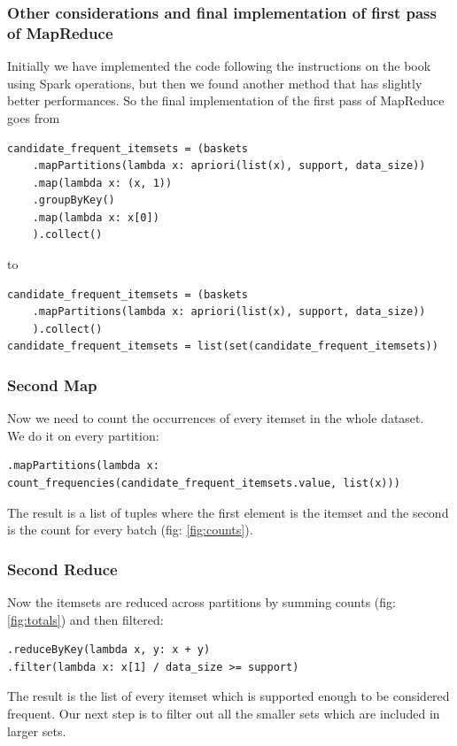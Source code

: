 \documentclass[a4paper]{article}
\begin{document}
	\subsubsection{Other considerations and final implementation of first pass of MapReduce}
	Initially we have implemented the code following the instructions on the book using Spark operations, but then we found another method that has slightly better performances. So the final implementation of the first pass of MapReduce goes from
	\begin{lstlisting}
candidate_frequent_itemsets = (baskets
    .mapPartitions(lambda x: apriori(list(x), support, data_size))
    .map(lambda x: (x, 1))                                             
    .groupByKey()                                                      
    .map(lambda x: x[0])                                               
    ).collect()
\end{lstlisting}
to
	\begin{lstlisting}
candidate_frequent_itemsets = (baskets
    .mapPartitions(lambda x: apriori(list(x), support, data_size))
    ).collect()
candidate_frequent_itemsets = list(set(candidate_frequent_itemsets))
\end{lstlisting}
	
	\subsubsection{Second Map}
	Now we need to count the occurrences of every itemset in the whole dataset.\\
	We do it on every partition:
	\begin{lstlisting}[numbers=none]
.mapPartitions(lambda x: count_frequencies(candidate_frequent_itemsets.value, list(x)))
\end{lstlisting}
	The result is a list of tuples where the first element is the itemset and the second is the count for every batch (fig: \ref{fig:counts}).
	
	\subsubsection{Second Reduce}
	Now the itemsets are reduced across partitions by summing counts (fig: \ref{fig:totals}) and then filtered:
	\begin{lstlisting}
.reduceByKey(lambda x, y: x + y)
.filter(lambda x: x[1] / data_size >= support)
\end{lstlisting}	
	The result is the list of every itemset which is supported enough to be considered frequent. Our next step is to filter out all the smaller sets which are included in larger sets.
	
\end{document}
